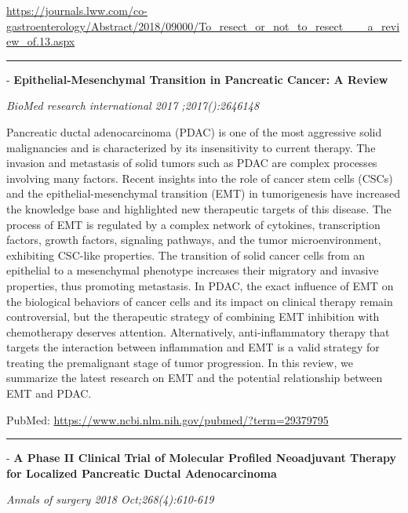 \documentclass[]{article}
\begin{document}
\url{https://journals.lww.com/co-gastroenterology/Abstract/2018/09000/To_resect_or_not_to_resect___a_review_of.13.aspx}

\begin{center}\rule{0.5\linewidth}{\linethickness}\end{center}

 - \textbf{Epithelial-Mesenchymal Transition in Pancreatic Cancer: A
Review}

\emph{BioMed research international 2017 ;2017():2646148}

Pancreatic ductal adenocarcinoma (PDAC) is one of the most aggressive
solid malignancies and is characterized by its insensitivity to current
therapy. The invasion and metastasis of solid tumors such as PDAC are
complex processes involving many factors. Recent insights into the role
of cancer stem cells (CSCs) and the epithelial-mesenchymal transition
(EMT) in tumorigenesis have increased the knowledge base and highlighted
new therapeutic targets of this disease. The process of EMT is regulated
by a complex network of cytokines, transcription factors, growth
factors, signaling pathways, and the tumor microenvironment, exhibiting
CSC-like properties. The transition of solid cancer cells from an
epithelial to a mesenchymal phenotype increases their migratory and
invasive properties, thus promoting metastasis. In PDAC, the exact
influence of EMT on the biological behaviors of cancer cells and its
impact on clinical therapy remain controversial, but the therapeutic
strategy of combining EMT inhibition with chemotherapy deserves
attention. Alternatively, anti-inflammatory therapy that targets the
interaction between inflammation and EMT is a valid strategy for
treating the premalignant stage of tumor progression. In this review, we
summarize the latest research on EMT and the potential relationship
between EMT and PDAC.

PubMed: \url{https://www.ncbi.nlm.nih.gov/pubmed/?term=29379795}

{}

{}

\begin{center}\rule{0.5\linewidth}{\linethickness}\end{center}

 - \textbf{A Phase II Clinical Trial of Molecular Profiled Neoadjuvant
Therapy for Localized Pancreatic Ductal Adenocarcinoma}

\emph{Annals of surgery 2018 Oct;268(4):610-619}
\end{document}
